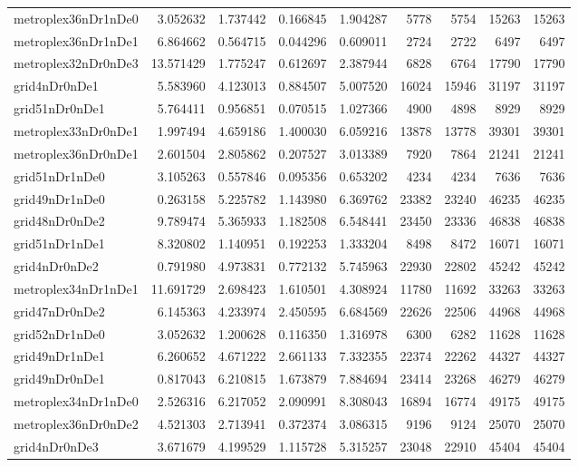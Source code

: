 \begin{longtable}{|l|r|r|r|r|r|r|r|r|}
metroplex36nDr1nDe0 & 3.052632 & 1.737442 & 0.166845 & 1.904287 & 5778 & 5754 & 15263 & 15263 \\
metroplex36nDr1nDe1 & 6.864662 & 0.564715 & 0.044296 & 0.609011 & 2724 & 2722 & 6497 & 6497 \\
metroplex32nDr0nDe3 & 13.571429 & 1.775247 & 0.612697 & 2.387944 & 6828 & 6764 & 17790 & 17790 \\
grid4nDr0nDe1 & 5.583960 & 4.123013 & 0.884507 & 5.007520 & 16024 & 15946 & 31197 & 31197 \\
grid51nDr0nDe1 & 5.764411 & 0.956851 & 0.070515 & 1.027366 & 4900 & 4898 & 8929 & 8929 \\
metroplex33nDr0nDe1 & 1.997494 & 4.659186 & 1.400030 & 6.059216 & 13878 & 13778 & 39301 & 39301 \\
metroplex36nDr0nDe1 & 2.601504 & 2.805862 & 0.207527 & 3.013389 & 7920 & 7864 & 21241 & 21241 \\
grid51nDr1nDe0 & 3.105263 & 0.557846 & 0.095356 & 0.653202 & 4234 & 4234 & 7636 & 7636 \\
grid49nDr1nDe0 & 0.263158 & 5.225782 & 1.143980 & 6.369762 & 23382 & 23240 & 46235 & 46235 \\
grid48nDr0nDe2 & 9.789474 & 5.365933 & 1.182508 & 6.548441 & 23450 & 23336 & 46838 & 46838 \\
grid51nDr1nDe1 & 8.320802 & 1.140951 & 0.192253 & 1.333204 & 8498 & 8472 & 16071 & 16071 \\
grid4nDr0nDe2 & 0.791980 & 4.973831 & 0.772132 & 5.745963 & 22930 & 22802 & 45242 & 45242 \\
metroplex34nDr1nDe1 & 11.691729 & 2.698423 & 1.610501 & 4.308924 & 11780 & 11692 & 33263 & 33263 \\
grid47nDr0nDe2 & 6.145363 & 4.233974 & 2.450595 & 6.684569 & 22626 & 22506 & 44968 & 44968 \\
grid52nDr1nDe0 & 3.052632 & 1.200628 & 0.116350 & 1.316978 & 6300 & 6282 & 11628 & 11628 \\
grid49nDr1nDe1 & 6.260652 & 4.671222 & 2.661133 & 7.332355 & 22374 & 22262 & 44327 & 44327 \\
grid49nDr0nDe1 & 0.817043 & 6.210815 & 1.673879 & 7.884694 & 23414 & 23268 & 46279 & 46279 \\
metroplex34nDr1nDe0 & 2.526316 & 6.217052 & 2.090991 & 8.308043 & 16894 & 16774 & 49175 & 49175 \\
metroplex36nDr0nDe2 & 4.521303 & 2.713941 & 0.372374 & 3.086315 & 9196 & 9124 & 25070 & 25070 \\
grid4nDr0nDe3 & 3.671679 & 4.199529 & 1.115728 & 5.315257 & 23048 & 22910 & 45404 & 45404 \\

\end{longtable}
